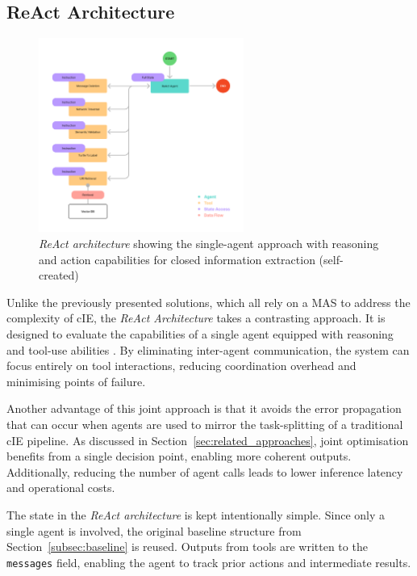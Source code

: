 \documentclass[a4paper,oneside,bibliography=totoc]{scrbook}
\begin{document}
\subsection{ReAct Architecture}
\label{subsec:react}

\begin{figure}[tp]
  \centering
  \includegraphics[width=0.6\textwidth]{figures/ReAct Architecture.png}
  \caption[\textit{ReAct architecture} showing the single-agent approach with reasoning and action capabilities for closed information extraction]{\textit{ReAct architecture} showing the single-agent approach with reasoning and action capabilities for closed information extraction (self-created)}
  \label{fig:react_architecture}
\end{figure}

Unlike the previously presented solutions, which all rely on a \ac{MAS} to address the complexity of \ac{cIE}, the \textit{\ac{ReAct} Architecture} takes a contrasting approach. It is designed to evaluate the capabilities of a single agent equipped with reasoning and tool-use abilities \cite{Yao2023}. By eliminating inter-agent communication, the system can focus entirely on tool interactions, reducing coordination overhead and minimising points of failure.

Another advantage of this joint approach is that it avoids the error propagation that can occur when agents are used to mirror the task-splitting of a traditional \ac{cIE} pipeline. As discussed in Section~\ref{sec:related_approaches}, joint optimisation benefits from a single decision point, enabling more coherent outputs. Additionally, reducing the number of agent calls leads to lower inference latency and operational costs.

The state in the \textit{\ac{ReAct} architecture} is kept intentionally simple. Since only a single agent is involved, the original baseline structure from Section~\ref{subsec:baseline} is reused. Outputs from tools are written to the \texttt{messages} field, enabling the agent to track prior actions and intermediate results.
\end{document}
